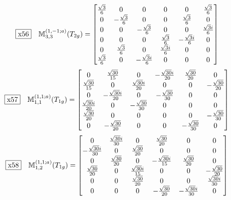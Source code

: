 \documentclass[fleqn,10pt,landscape]{jsarticle}
\begin{document}
\begin{dmath*}
\fbox{x56}\quad \mathbb{M}_{3,3}^{(1,-1;a)}(T_{2g})=\begin{bmatrix} \frac{\sqrt{3}}{6} & 0 & 0 & 0 & 0 & \frac{\sqrt{3}}{6} \\ 0 & - \frac{\sqrt{3}}{6} & 0 & 0 & \frac{\sqrt{3}}{6} & 0 \\ 0 & 0 & - \frac{\sqrt{3}}{6} & 0 & 0 & \frac{\sqrt{3} i}{6} \\ 0 & 0 & 0 & \frac{\sqrt{3}}{6} & - \frac{\sqrt{3} i}{6} & 0 \\ 0 & \frac{\sqrt{3}}{6} & 0 & \frac{\sqrt{3} i}{6} & 0 & 0 \\ \frac{\sqrt{3}}{6} & 0 & - \frac{\sqrt{3} i}{6} & 0 & 0 & 0 \end{bmatrix}
\end{dmath*}
\begin{dmath*}
\fbox{x57}\quad \mathbb{M}_{1,1}^{(1,1;a)}(T_{1g})=\begin{bmatrix} 0 & \frac{\sqrt{30}}{15} & 0 & - \frac{\sqrt{30} i}{20} & \frac{\sqrt{30}}{20} & 0 \\ \frac{\sqrt{30}}{15} & 0 & \frac{\sqrt{30} i}{20} & 0 & 0 & - \frac{\sqrt{30}}{20} \\ 0 & - \frac{\sqrt{30} i}{20} & 0 & - \frac{\sqrt{30}}{30} & 0 & 0 \\ \frac{\sqrt{30} i}{20} & 0 & - \frac{\sqrt{30}}{30} & 0 & 0 & 0 \\ \frac{\sqrt{30}}{20} & 0 & 0 & 0 & 0 & - \frac{\sqrt{30}}{30} \\ 0 & - \frac{\sqrt{30}}{20} & 0 & 0 & - \frac{\sqrt{30}}{30} & 0 \end{bmatrix}
\end{dmath*}
\begin{dmath*}
\fbox{x58}\quad \mathbb{M}_{1,2}^{(1,1;a)}(T_{1g})=\begin{bmatrix} 0 & \frac{\sqrt{30} i}{30} & 0 & \frac{\sqrt{30}}{20} & 0 & 0 \\ - \frac{\sqrt{30} i}{30} & 0 & \frac{\sqrt{30}}{20} & 0 & 0 & 0 \\ 0 & \frac{\sqrt{30}}{20} & 0 & - \frac{\sqrt{30} i}{15} & \frac{\sqrt{30}}{20} & 0 \\ \frac{\sqrt{30}}{20} & 0 & \frac{\sqrt{30} i}{15} & 0 & 0 & - \frac{\sqrt{30}}{20} \\ 0 & 0 & \frac{\sqrt{30}}{20} & 0 & 0 & \frac{\sqrt{30} i}{30} \\ 0 & 0 & 0 & - \frac{\sqrt{30}}{20} & - \frac{\sqrt{30} i}{30} & 0 \end{bmatrix}
\end{dmath*}
\end{document}
